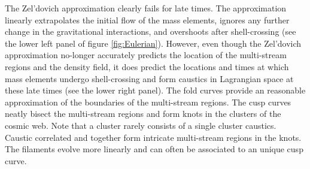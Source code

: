 \documentclass[a4paper, 11pt]{article}
\begin{document}
The Zel'dovich approximation clearly fails for late times. The approximation linearly extrapolates the initial flow of the mass elements, ignores any further change in the gravitational interactions, and overshoots after shell-crossing (see the lower left panel of figure \ref{fig:Eulerian}). However, even though the Zel'dovich approximation no-longer accurately predicts the location of the multi-stream regions and the density field, it does predict the locations and times at which mass elements undergo shell-crossing and form caustics in Lagrangian space at these late times (see the lower right panel). The fold curves provide an reasonable approximation of the boundaries of the multi-stream regions. The cusp curves neatly bisect the multi-stream regions and form knots in the clusters of the cosmic web. Note that a cluster rarely consists of a single cluster caustics. Caustic correlated and together form intricate multi-stream regions in the knots. The filaments evolve more linearly and can often be associated to an unique cusp curve.
\end{document}

